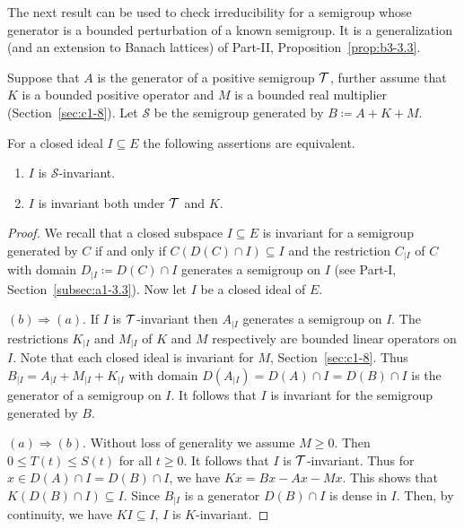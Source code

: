 
The next result can be used to check irreducibility for a semigroup whose generator is a bounded perturbation of a known semigroup. It is a generalization (and an extension to Banach lattices) of Part-II, Proposition~\ref{prop:b3-3.3}. 
\begin{proposition}\label{prop:c3-3.3}
	Suppose that $A$ is the generator of a positive semigroup $\mathcal{T}$, further assume that $K$ is a bounded positive operator and $M$ is a bounded real multiplier (\cf Section~\ref{sec:c1-8}).
	Let $\mathcal{S}$ be the semigroup generated by $B \coloneq A + K + M$.
	
	For a closed ideal $I \subseteq E$ the following assertions are equivalent.
	\begin{enumerate}[\upshape (a)]
		\item 
		$I$ is $\mathcal{S}$-invariant.
	
		\item 
		$I$ is invariant both under $\mathcal{T}$ and $K$.
	\end{enumerate}
\end{proposition}
\begin{proof}
We recall that a closed subspace $I \subseteq E$ is invariant for a semigroup generated by $C$ if and only if\/ $C(D(C)\cap I) \subseteq I$ and the restriction $C_{|I}$ of\/ $C$ with domain $D_{|I} \coloneq D(C)\cap I$ generates a semigroup on $I$ (see Part-I, Section~\ref{subsec:a1-3.3}).
Now let $I$ be a closed ideal of\/ $E$.

$(b)\Rightarrow (a)$.
If\/ $I$ is $\mathcal{T}$-invariant then $A_{|I}$ generates a semigroup on $I$.
The restrictions $K_{|I}$ and $M_{|I}$ of\/ $K$ and $M$ respectively are bounded linear operators on $I$.
Note that each closed ideal is invariant for $M$, \cf Section~\ref{sec:c1-8}.
Thus $B_{|I} = A_{|I} + M_{|I} + K_{|I}$ with domain $D(A_{|I}) = D(A)\cap I = D(B)\cap I$ is the generator of a semigroup on $I$.
It follows that $I$ is invariant for the semigroup generated by $B$.

$(a) \Rightarrow (b)$.
Without loss of generality we assume $M \geq 0$.
Then $0 \leq T(t) \leq S(t)$ for all $t \geq 0$.
It follows that $I$ is $\mathcal{T}$-invariant.
Thus for $x \in D(A)\cap I = D(B)\cap I$, we have $Kx = Bx - Ax - Mx$.
This shows that $K(D(B)\cap I) \subseteq I$.
Since $B_{\vert I}$ is a generator $D(B)\cap I$ is dense in $I$.
Then, by continuity, we have $KI \subseteq I$, \ie  $I$ is $K$-invariant.
\end{proof}
